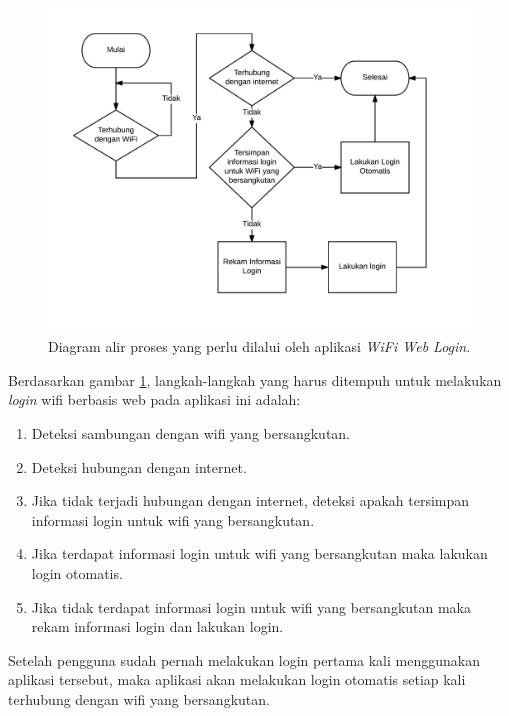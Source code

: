 \begin{figure}[h]
    \centering
    \includegraphics[scale=0.85]{Gambar/WifiWebLogin.png}
    \caption[Diagram alir proses yang perlu dilalui oleh aplikasi \textit{WiFi Web Login}.]{Diagram alir proses yang perlu dilalui oleh aplikasi \textit{WiFi Web Login}.} 
    \label{fig:wifiweblogin}
\end{figure}

Berdasarkan gambar \ref{fig:wifiweblogin}, langkah-langkah yang harus ditempuh untuk melakukan \textit{login} wifi berbasis web pada aplikasi ini adalah:

\begin{enumerate}
    \item{Deteksi sambungan dengan wifi yang bersangkutan.}
    \item{Deteksi hubungan dengan internet.}
    \item{Jika tidak terjadi hubungan dengan internet, deteksi apakah tersimpan informasi login untuk wifi yang bersangkutan.}
    \item{Jika terdapat informasi login untuk wifi yang bersangkutan maka lakukan login otomatis.}
    \item{Jika tidak terdapat informasi login untuk wifi yang bersangkutan maka rekam informasi login dan lakukan login.}
\end{enumerate}

Setelah pengguna sudah pernah melakukan login pertama kali menggunakan aplikasi tersebut, maka aplikasi akan melakukan login otomatis setiap kali terhubung dengan wifi yang bersangkutan.